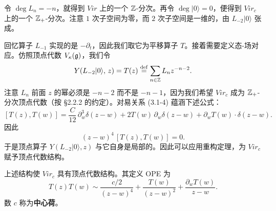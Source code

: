 令 $\deg L_n=-n$，就得到 $\mathit{Vir}$ 上的一个 $\mathbb{Z}$-分次。再令 $\deg|0\rangle=0$，便得到 $\mathit{Vir}_c$ 上的一个 $\mathbb{Z}_+$-分次。注意 $1$ 次子空间为零，而 $2$ 次子空间是一维的，由 $L_{-2}|0\rangle$ 张成。

回忆算子 $L_{-1}$ 实现的是 $-\partial_t$，因此我们取它为平移算子 $T$。接着需要定义态-场对应。仿照顶点代数 $V_\kappa(\mathfrak{g})$，我们令
\[
    Y(L_{-2}|0\rangle,\, z) = T(z)
    \overset{\mathrm{def}}{=} \sum_{n\in\mathbb{Z}} L_n z^{-n-2}.
\]
注意 $L_n$ 前面 $z$ 的幂必须是 $-n-2$ 而不是 $-n-1$，因为我们希望 $\mathit{Vir}_c$ 成为 $\mathbb{Z}_+$-分次顶点代数（按 §2.2.2 的约定）。对易关系 (3.1-4) 蕴涵下述公式：
\[
    [T(z), T(w)] = \frac{C}{12}\,\partial_w^3\delta(z-w)
    + 2T(w)\,\partial_w\delta(z-w)
    + \partial_w T(w)\cdot\delta(z-w).
\]
因此
\[
    (z-w)^4\,[T(z), T(w)] = 0 .
\]
于是顶点算子 $Y(L_{-2}|0\rangle,z)$ 与它自身是局部的。因此可以应用重构定理，为 $\mathit{Vir}_c$ 赋予顶点代数结构。


\begin{theorem}
    上述结构使 $\mathit{Vir}_c$ 具有顶点代数结构。其定义 OPE 为
    \[
        T(z)T(w) \sim \frac{c/2}{(z-w)^4} + \frac{T(w)}{(z-w)^2} + \frac{\partial_w T(w)}{z-w}.
    \]
    数 $c$ 称为\textbf{中心荷}。
\end{theorem}


